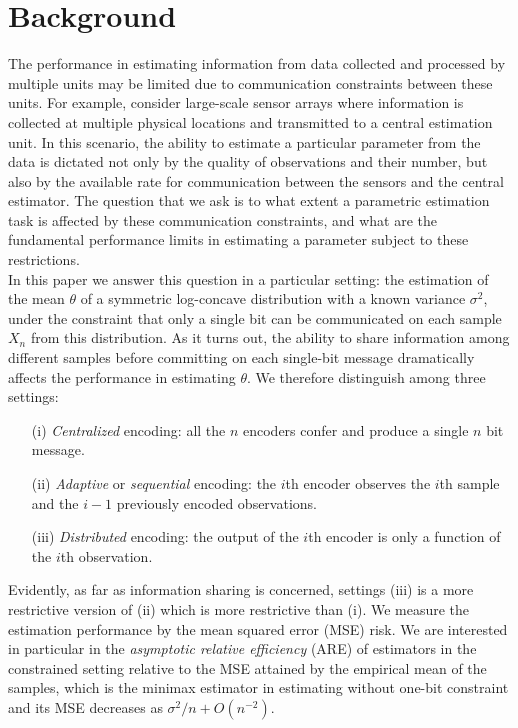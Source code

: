 \documentclass[letterpaper, conference]{IEEEtran}      %
\begin{document}
\section{Background}
\label{sec:Intro}
The performance in estimating information from data collected and processed by multiple units may be limited due to communication constraints between these units. 
For example, consider large-scale sensor arrays where information is collected at multiple physical locations and transmitted to a central estimation unit. In this scenario, the ability to estimate a particular parameter from the data is dictated not only by the quality of observations and their number, but also by the available rate for communication between the sensors and the central estimator. The question that we ask is to what extent a parametric estimation task is affected by these communication constraints, and what are the fundamental performance limits in estimating a parameter subject to these restrictions. \\
In this paper we answer this question in a particular setting: the estimation of the mean $\theta$ of a symmetric log-concave distribution with a known variance $\sigma^2$, under the constraint that only a single bit can be communicated on each sample $X_n$ from this distribution. As it turns out, the ability to share information among different samples before committing on each single-bit message dramatically affects the performance in estimating $\theta$. We therefore distinguish among three settings:
\begin{itemize}
 \item[(i)] \emph{Centralized} encoding: all the $n$ encoders confer and produce a single $n$ bit message. 
 \item[(ii)] \emph{Adaptive} or \emph{sequential} encoding: the $i$th encoder observes the $i$th sample and the $i-1$ previously encoded observations.
 \item[(iii)] \emph{Distributed} encoding: the output of the $i$th encoder is only a function of the $i$th observation.
 \end{itemize}
Evidently, as far as information sharing is concerned, settings (iii) is a more restrictive version of (ii) which is more restrictive than (i). We measure the estimation performance by the mean squared error (MSE) risk. We are interested in particular in the \emph{asymptotic relative efficiency} (ARE) of estimators in the constrained setting relative to the MSE attained by the empirical mean of the samples, which is the minimax estimator in estimating without one-bit constraint and its MSE decreases as $\sigma^2/n+O(n^{-2})$. \\
\end{document}
